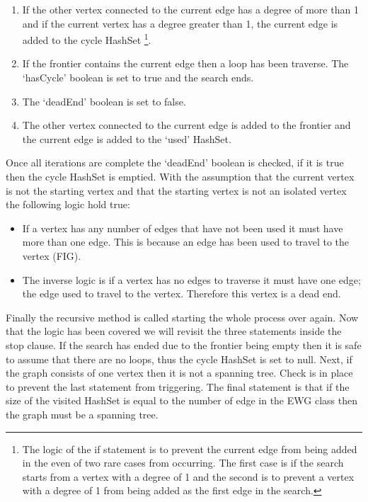 \documentclass{AISB2008}
\begin{document}
{\begin{enumerate}
\item If the other vertex connected to the current edge has a degree of more than 1 and if the current vertex has a degree greater than 1, the current edge is added to the cycle HashSet \footnote{The logic of the if statement is to prevent the current edge from being added in the even of two rare cases from occurring. The first case is if the search starts from a vertex with a degree of 1 and the second is to prevent a vertex with a degree of 1 from being added as the first edge in the search.}.
\item If the frontier contains the current edge then a loop has been traverse. The ‘hasCycle’ boolean is set to true and the search ends.
\item The ‘deadEnd’ boolean is set to false.
\item The other vertex connected to the current edge is added to the frontier and the current edge is added to the ‘used’ HashSet.
\end{enumerate}

Once all iterations are complete the ‘deadEnd’ boolean is checked, if it is true then the cycle HashSet is emptied. With the assumption that the current vertex is not the starting vertex and that the starting vertex is not an isolated vertex the following logic hold true:

\begin{itemize}
\item If a vertex has any number of edges that have not been used it must have more than one edge. This is because an edge has been used to travel to the vertex (FIG). 
\item The inverse logic is if a vertex has no edges to traverse it must have one edge; the edge used to travel to the vertex. Therefore this vertex is a dead end.
\end{itemize}

Finally the recursive method is called starting the whole process over again. Now that the logic has been covered we will revisit the three statements inside the stop clause. If the search has ended due to the frontier being empty then it is safe to assume that there are no loops, thus the cycle HashSet is set to null. Next, if the graph consists of one vertex then it is not a spanning tree. Check is in place to prevent the last statement from triggering. The final statement is that if the size of the visited HashSet is equal to the number of edge in the EWG class then the graph must be a spanning tree.


}
\end{document}
